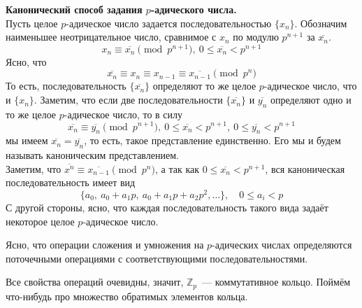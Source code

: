 \documentclass[11pt]{report}
\begin{document}
    \begin{remark} \textbf{Канонический способ задания $p$-адического числа.}\\
        Пусть целое $p$-адическое число задается последовательностью $\{ x_n \}$. Обозначим наименьшее неотрицательное
        число, сравнимое с $x_n$ по модулю $p^{n + 1}$ за $\overline{x_n}$.
        \[ x_n \equiv \overline{x_n} \pmod{p^{n + 1}}, \ 0 \le \overline{x_n} < p^{n + 1} \]
        Ясно, что
        \[ \overline{x_n} \equiv x_n \equiv x_{n - 1} \equiv \overline{x_{n - 1}} \pmod{p^n}\]
        То есть, последовательность $\{ \overline{x_n} \}$ определяют то же целое $p$-адическое число, что и $\{ x_n \}$.
        Заметим, что если две последовательности $\{ \overline{x_n} \}$ и $\overline{y_n}$ определяют одно и то же целое $p$-адическое число, то
        в силу
        \[ \overline{x_n} \equiv \overline{y_n} \pmod{p^{n + 1}}, \ 0 \le \overline{x_n} < p^{n + 1}, \ 0 \le \overline{y_n} < p^{n + 1}\]
        мы имеем $\overline{x_n} = \overline{y_n}$, то есть, такое представление единственно. Его мы и будем называть каноническим представлением. \\


        Заметим, что $\overline{x^n} \equiv \overline{x_{n - 1}} \pmod{p^n}$, а так как $0 \le \overline{x_n} < p^{n + 1}$, вся каноническая
        последовательность имеет вид
        \[ \{ a_0, \ a_0 + a_1 p, \ a_0 + a_1 p + a_2 p^2, \ldots \}, \quad 0 \le a_i < p \]
        С другой стороны, ясно, что каждая последовательность такого вида задаёт некоторое целое $p$-адическое число.
    \end{remark}

    Ясно, что операции сложения и умножения на $p$-адических числах определяются поточечными операциями с соответствующими
    последовательностями.

    Все свойства операций очевидны, значит, $\mathbb{Z}_p$~--- коммутативное кольцо. Поймём что-нибудь про множество обратимых элементов кольца.
\end{document}
